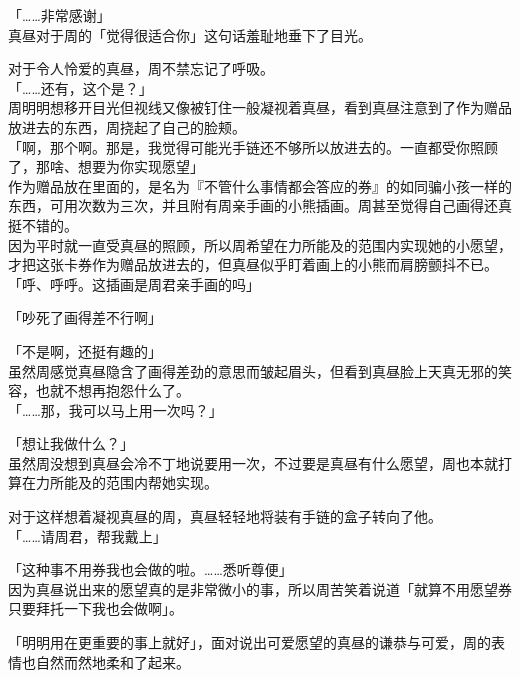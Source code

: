 「……非常感谢」\\

真昼对于周的「觉得很适合你」这句话羞耻地垂下了目光。

对于令人怜爱的真昼，周不禁忘记了呼吸。\\

「……还有，这个是？」\\

周明明想移开目光但视线又像被钉住一般凝视着真昼，看到真昼注意到了作为赠品放进去的东西，周挠起了自己的脸颊。\\

「啊，那个啊。那是，我觉得可能光手链还不够所以放进去的。一直都受你照顾了，那啥、想要为你实现愿望」\\

作为赠品放在里面的，是名为『不管什么事情都会答应的券』的如同骗小孩一样的东西，可用次数为三次，并且附有周亲手画的小熊插画。周甚至觉得自己画得还真挺不错的。\\

因为平时就一直受真昼的照顾，所以周希望在力所能及的范围内实现她的小愿望，才把这张卡券作为赠品放进去的，但真昼似乎盯着画上的小熊而肩膀颤抖不已。\\

「呼、呼呼。这插画是周君亲手画的吗」

「吵死了画得差不行啊」

「不是啊，还挺有趣的」\\

虽然周感觉真昼隐含了画得差劲的意思而皱起眉头，但看到真昼脸上天真无邪的笑容，也就不想再抱怨什么了。\\

「……那，我可以马上用一次吗？」

「想让我做什么？」\\

虽然周没想到真昼会冷不丁地说要用一次，不过要是真昼有什么愿望，周也本就打算在力所能及的范围内帮她实现。

对于这样想着凝视真昼的周，真昼轻轻地将装有手链的盒子转向了他。\\

「……请周君，帮我戴上」

「这种事不用券我也会做的啦。……悉听尊便」\\

因为真昼说出来的愿望真的是非常微小的事，所以周苦笑着说道「就算不用愿望券只要拜托一下我也会做啊」。

「明明用在更重要的事上就好」，面对说出可爱愿望的真昼的谦恭与可爱，周的表情也自然而然地柔和了起来。\\

